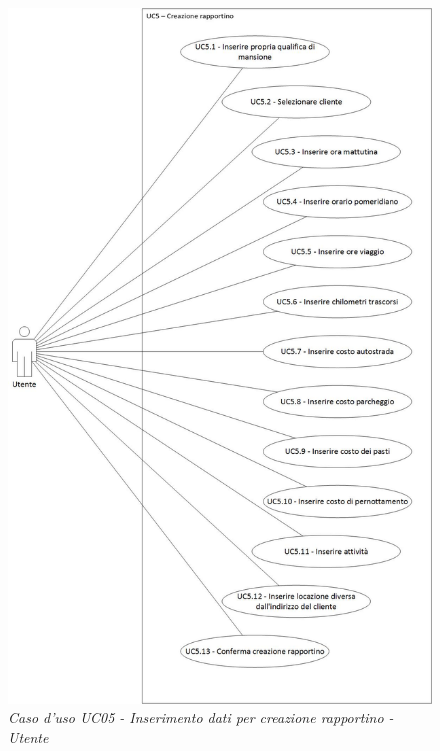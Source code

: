 	\begin{figure}[ht]
		\centering
		\includegraphics[scale=0.35]{immagini/analisi/UC05_creazione_rapportino_utente.jpg}
		\caption{\textit{Caso d'uso UC05 - Inserimento dati per creazione rapportino - Utente}}
	\end{figure}\FloatBarrier
	
